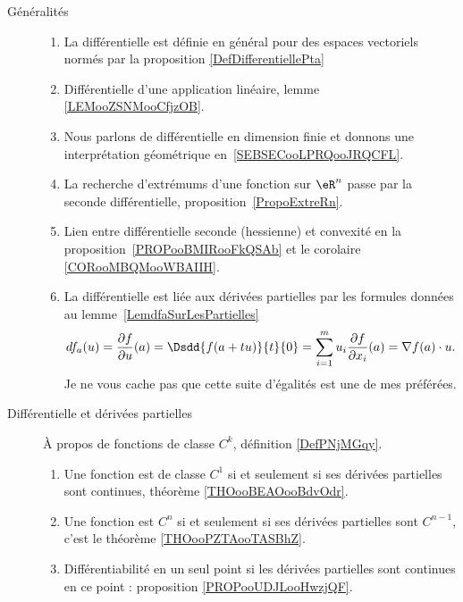 
\begin{description}
	\item[Généralités]
	      \begin{enumerate}
		      \item
		            La différentielle est définie en général pour des espaces vectoriels normés par la proposition \ref{DefDifferentiellePta}
		      \item
                  Différentielle d'une application linéaire, lemme \ref{LEMooZSNMooCfjzOB}.
		      \item
		            Nous parlons de différentielle en dimension finie et donnons une interprétation géométrique en~\ref{SEBSECooLPRQooJRQCFL}.
		      \item
		            La recherche d'extrémums d'une fonction sur \( \eR^n\) passe par la seconde différentielle, proposition~\ref{PropoExtreRn}.
		      \item
		            Lien entre différentielle seconde (hessienne) et convexité en la proposition~\ref{PROPooBMIRooFkQSAb} et le corolaire \ref{CORooMBQMooWBAIIH}.
		      \item
		            La différentielle est liée aux dérivées partielles par les formules données au lemme~\ref{LemdfaSurLesPartielles}
		            \begin{equation}
			            df_a(u)=\frac{ \partial f }{ \partial u }(a)=\Dsdd{ f(a+tu) }{t}{0}=\sum_{i=1}^mu_i\frac{ \partial f }{ \partial x_i }(a)=\nabla f(a)\cdot u.
		            \end{equation}
		            Je ne vous cache pas que cette suite d'égalités est une de mes préférées.
	      \end{enumerate}
	\item[Différentielle et dérivées partielles]
	      À propos de fonctions de classe \( C^k\), définition \ref{DefPNjMGqy}.
	      \begin{enumerate}
		      \item
		            Une fonction est de classe \( C^1\) si et seulement si ses dérivées partielles sont continues, théorème \ref{THOooBEAOooBdvOdr}.
		      \item
		            Une fonction est \( C^n\) si et seulement si ses dérivées partielles sont \( C^{n-1}\), c'est le théorème \ref{THOooPZTAooTASBhZ}.
		      \item
		            Différentiabilité en un seul point si les dérivées partielles sont continues en ce point : proposition \ref{PROPooUDJLooHwzjQF}.

\end{enumerate}
\end{description}
